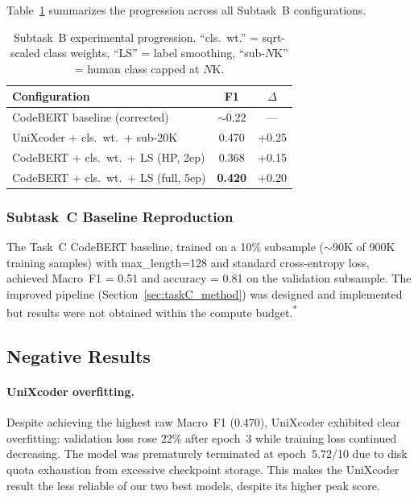 \documentclass[11pt]{article}
\begin{document}
Table~\ref{tab:taskB_comparison} summarizes the progression across all Subtask~B configurations.

\begin{table}[ht]
\centering
\footnotesize
\begin{tabularx}{\columnwidth}{@{}X c c@{}}
\toprule
\textbf{Configuration} & \textbf{F1} & \textbf{$\Delta$} \\ \midrule
CodeBERT baseline (corrected) & $\sim$0.22 & --- \\
UniXcoder + cls.\ wt.\ + sub-20K & 0.470 & +0.25 \\
CodeBERT + cls.\ wt.\ + LS (HP, 2ep) & 0.368 & +0.15 \\
CodeBERT + cls.\ wt.\ + LS (full, 5ep) & \textbf{0.420} & +0.20 \\
\bottomrule
\end{tabularx}
\caption{Subtask~B experimental progression. ``cls.\ wt.'' = sqrt-scaled class weights, ``LS'' = label smoothing, ``sub-$N$K'' = human class capped at $N$K.}
\label{tab:taskB_comparison}
\end{table}

\subsubsection{Subtask~C Baseline Reproduction}

The Task~C CodeBERT baseline, trained on a 10\% subsample ($\sim$90K of 900K training samples) with max\_length=128 and standard cross-entropy loss, achieved Macro~F1 = 0.51 and accuracy = 0.81 on the validation subsample. The improved pipeline (Section~\ref{sec:taskC_method}) was designed and implemented but results were not obtained within the compute budget.\textsuperscript{*}

\subsection{Negative Results}

\paragraph{UniXcoder overfitting.} Despite achieving the highest raw Macro~F1 (0.470), UniXcoder exhibited clear overfitting: validation loss rose 22\% after epoch~3 while training loss continued decreasing. The model was prematurely terminated at epoch~5.72/10 due to disk quota exhaustion from excessive checkpoint storage. This makes the UniXcoder result the less reliable of our two best models, despite its higher peak score.
\end{document}
